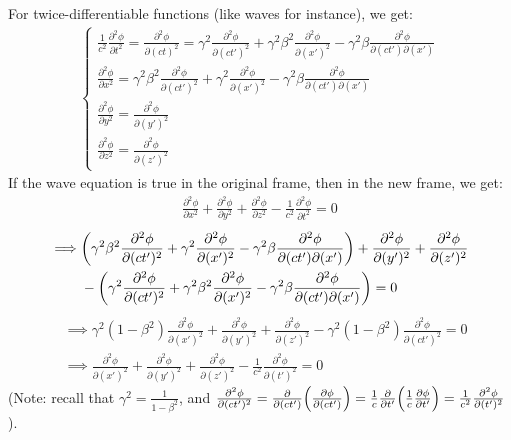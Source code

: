 \documentclass{article}
\DeclarePairedDelimiter{\paran}{(}{)}%
\begin{document}
For twice-differentiable functions (like waves for instance), we get:
\begin{align}
    \begin{cases}
        \frac{1}{c^2}\frac{\partial^2\phi}{\partial t^2}=\frac{\partial^2 \phi}{\partial (ct)^2} = \gamma^2\frac{\partial^2\phi}{\partial (ct')^2} + \gamma^2\beta^2\frac{\partial^2\phi}{\partial (x')^2} - \gamma^2\beta\frac{\partial^2\phi}{\partial(ct')\partial (x')}\\
        \frac{\partial^2\phi}{\partial x^2} = \gamma^2\beta^2\frac{\partial^2\phi}{\partial (ct')^2} + \gamma^2\frac{\partial^2\phi}{\partial (x')^2}-\gamma^2\beta\frac{\partial^2\phi}{\partial (ct')\partial (x')}\\
        \frac{\partial^2\phi}{\partial y^2}=\frac{\partial^2\phi}{\partial (y')^2}\\
        \frac{\partial^2\phi}{\partial z^2}=\frac{\partial^2\phi}{\partial (z')^2}
    \end{cases}
\end{align}
If the wave equation is true in the original frame, then in the new frame, we get:
\begin{align}
    \frac{\partial^2\phi}{\partial x^2}+\frac{\partial^2\phi}{\partial y^2} + \frac{\partial^2\phi}{\partial z^2}-\frac{1}{c^2}\frac{\partial^2\phi}{\partial t^2}=0
\end{align}
\begin{align}
    \implies &\paran*{\gamma^2\beta^2\frac{\partial^2\phi}{\partial (ct')^2} + \gamma^2\frac{\partial^2\phi}{\partial (x')^2}-\gamma^2\beta\frac{\partial^2\phi}{\partial (ct')\partial (x')}} + \frac{\partial^2\phi}{\partial (y')^2} + \frac{\partial^2\phi}{\partial (z')^2} \\ 
    &- \paran*{\gamma^2\frac{\partial^2\phi}{\partial (ct')^2} + \gamma^2\beta^2\frac{\partial^2\phi}{\partial (x')^2} - \gamma^2\beta\frac{\partial^2\phi}{\partial(ct')\partial (x')}} = 0
\end{align}
\begin{align}
    &\implies \gamma^2(1-\beta^2)\frac{\partial^2\phi}{\partial (x')^2}+\frac{\partial^2\phi}{\partial (y')^2} + \frac{\partial^2\phi}{\partial (z')^2}  - \gamma^2(1-\beta^2)\frac{\partial^2\phi}{\partial (ct')^2}=0\\
    &\implies \frac{\partial^2\phi}{\partial (x')^2}+\frac{\partial^2\phi}{\partial (y')^2} + \frac{\partial^2\phi}{\partial (z')^2}  - \frac{1}{c^2}\frac{\partial^2\phi}{\partial (t')^2}=0
\end{align}
(Note: recall that $\gamma^2 = \frac{1}{1-\beta^2}$, and $\frac{\partial^2\phi}{\partial (ct')^2} = \frac{\partial}{\partial (ct')}\paran*{\frac{\partial\phi}{\partial (ct')}} = \frac{1}{c}\frac{\partial}{\partial t'}\paran*{\frac{1}{c}\frac{\partial\phi}{\partial t'}}=\frac{1}{c^2}\frac{\partial^2\phi}{\partial (t')^2}$).
\end{document}
